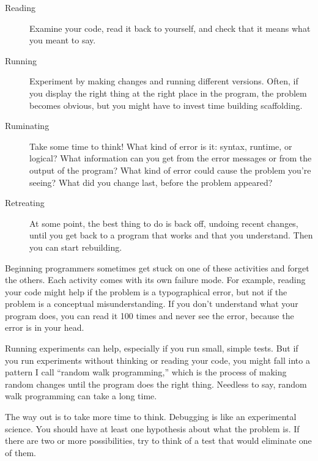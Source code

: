 \begin{description}

\item[Reading] Examine your code, read it back to yourself, and
check that it means what you meant to say.

\item[Running] Experiment by making changes and running different
versions.  Often, if you display the right thing at the right place
in the program, the problem becomes obvious, but you might have to invest time building scaffolding.

\item[Ruminating] Take some time to think!  What kind of error
is it: syntax, runtime, or logical?  What information can you get from
the error messages or from the output of the program?  What kind of
error could cause the problem you're seeing?  What did you change
last, before the problem appeared?

\item[Retreating] At some point, the best thing to do is back
off, undoing recent changes, until you get back to a program that
works and that you understand.  Then you can start rebuilding.

\end{description}

Beginning programmers sometimes get stuck on one of these activities
and forget the others.  Each activity comes with its own failure
mode.
For example, reading your code might help if the problem is a
typographical error, but not if the problem is a conceptual
misunderstanding.  If you don't understand what your program does, you
can read it 100 times and never see the error, because the error is in
your head.

Running experiments can help, especially if you run small, simple
tests.  But if you run experiments without thinking or reading your
code, you might fall into a pattern I call ``random walk programming,''
which is the process of making random changes until the program
does the right thing.  Needless to say, random walk programming
can take a long time.


The way out is to take more time to think.  Debugging is like an
experimental science.  You should have at least one hypothesis about
what the problem is.  If there are two or more possibilities, try to
think of a test that would eliminate one of them.


